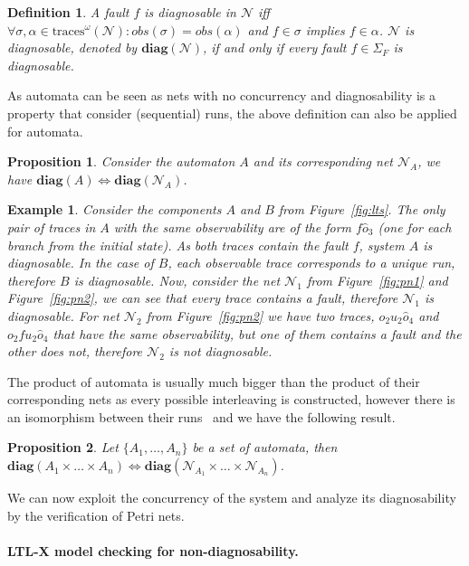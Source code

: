 \documentclass[a4paper]{article}
\newcommand{\diag}[1]{\textbf{diag}(#1)}
\newcommand{\obs}[1]{obs(#1)}
\newcommand\netn{{\mathcal{N}}}
\newtheorem{exmp}{Example}
\newtheorem{prop}{Proposition}
\newtheorem{defn}{Definition}
\newcommand{\inftraces}[1]{\mathrm{traces}^{\omega}(#1)}
\begin{document}
\begin{defn}
  A fault $f$ is diagnosable in $\netn$ iff $\forall \sigma, \alpha \in \inftraces \netn: \obs \sigma = \obs \alpha$ and $f \in \sigma$ implies $f \in \alpha$. $\netn$ is diagnosable, denoted by $\diag \netn$, if and only if every fault $f \in \Sigma_F$ is diagnosable.
\end{defn}

As automata can be seen as nets with no concurrency and diagnosability is a property that consider (sequential) runs, the above definition can also be applied for automata.

\begin{prop}
 Consider the automaton $A$ and its corresponding net $\netn_A$, we have $\diag A \Leftrightarrow \diag{\netn_A}$.
\end{prop}

\begin{exmp}
  Consider the components $A$ and $B$ from Figure~\ref{fig:lts}. The only pair of traces in $A$ with the same observability are of the form $f\widehat{o}_3$ (one for each branch from the initial state). As both traces contain the fault $f$, system $A$ is diagnosable. In the case of $B$, each observable trace corresponds to a unique run, therefore $B$ is diagnosable. Now, consider the net $\netn_1$ from Figure~\ref{fig:pn1} and Figure~\ref{fig:pn2}, we can see that every trace contains a fault, therefore $\netn_1$ is diagnosable. For net $\netn_2$ from Figure~\ref{fig:pn2} we have two traces, $o_2u_2\widehat{o}_4$ and $o_2fu_2\widehat{o}_4$ that have the same observability, but one of them contains a fault and the other does not, therefore $\netn_2$ is not diagnosable.
  \label{ex:one}
\end{exmp}

The product of automata is usually much bigger than the product of their corresponding nets as every possible interleaving is constructed, however there is an isomorphism between their runs~\cite{runs_prod} and we have the following result.

\begin{prop}
  Let $\{A_1, \dots, A_n\}$ be a set of automata, then $\diag{A_1 \times \dots \times A_n} \Leftrightarrow \diag{\netn_{A_1} \times \dots \times \netn_{A_n}}$.
\end{prop}

We can now exploit the concurrency of the system and analyze its diagnosability by the verification of Petri nets. 

\paragraph{LTL-X model checking for non-diagnosability.}
\end{document}
